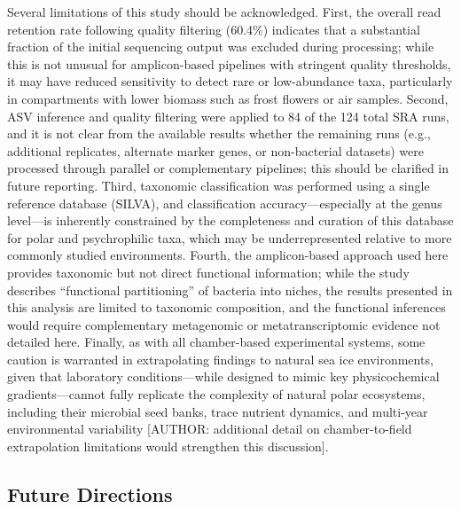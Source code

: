 \documentclass[
  11pt,
]{article}
\begin{document}
Several limitations of this study should be acknowledged. First, the
overall read retention rate following quality filtering (60.4\%)
indicates that a substantial fraction of the initial sequencing output
was excluded during processing; while this is not unusual for
amplicon-based pipelines with stringent quality thresholds, it may have
reduced sensitivity to detect rare or low-abundance taxa, particularly
in compartments with lower biomass such as frost flowers or air samples.
Second, ASV inference and quality filtering were applied to 84 of the
124 total SRA runs, and it is not clear from the available results
whether the remaining runs (e.g., additional replicates, alternate
marker genes, or non-bacterial datasets) were processed through parallel
or complementary pipelines; this should be clarified in future
reporting. Third, taxonomic classification was performed using a single
reference database (SILVA), and classification accuracy---especially at
the genus level---is inherently constrained by the completeness and
curation of this database for polar and psychrophilic taxa, which may be
underrepresented relative to more commonly studied environments. Fourth,
the amplicon-based approach used here provides taxonomic but not direct
functional information; while the study describes ``functional
partitioning'' of bacteria into niches, the results presented in this
analysis are limited to taxonomic composition, and the functional
inferences would require complementary metagenomic or metatranscriptomic
evidence not detailed here. Finally, as with all chamber-based
experimental systems, some caution is warranted in extrapolating
findings to natural sea ice environments, given that laboratory
conditions---while designed to mimic key physicochemical
gradients---cannot fully replicate the complexity of natural polar
ecosystems, including their microbial seed banks, trace nutrient
dynamics, and multi-year environmental variability {[}AUTHOR: additional
detail on chamber-to-field extrapolation limitations would strengthen
this discussion{]}.

\subsection{Future Directions}\label{future-directions}
\end{document}
